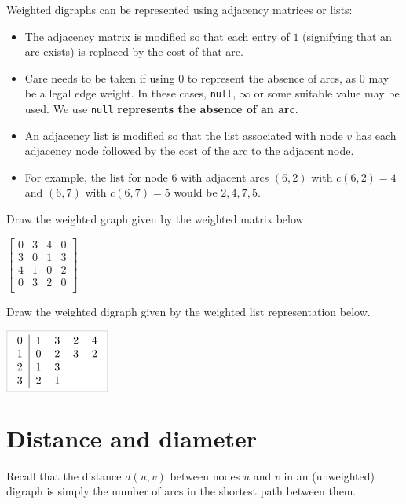 Weighted digraphs can be represented using adjacency matrices or lists:
\begin{itemize}
  \item The adjacency matrix is modified so that each entry of $1$ (signifying that an arc exists) 
  is replaced by the cost of that arc.
  \item Care needs to be taken if using 0 to represent the absence of arcs, as 0 may be a legal edge weight. 
  In these cases, \texttt{null}, $\infty$ or some suitable value may be used.
  We use  \texttt{null} \textbf{represents the absence of an arc}. 
  \item An adjacency list is modified so that the list associated  with node $v$ has each adjacency node followed by the cost of the arc to the adjacent node. 
  \item For example, the list for node 6 with adjacent arcs $(6,2)$ with $c(6,2) = 4$ and $(6,7)$ with $c(6,7) = 5$ would be $2,4,7,5$.
\end{itemize}

\begin{Boxample}[0] \label{ex:drawWeightedGraph}
Draw the weighted graph given by the weighted matrix below. 
\newline

$\left[
\begin{array}{cccc}
	0 & 3 & 4 & 0  \\
	3 & 0 & 1 & 3  \\
	4 & 1 & 0 & 2  \\
	0 & 3 & 2 & 0  \\
\end{array}
\right]$
\vspace{1cm}


Draw the weighted digraph given by the weighted list representation below.
\newline

$\AdjLists{
\begin{tabular}{c|llll}
	0 & 1 & 3 & 2 & 4 \\
	1 & 0 & 2 & 3 & 2 \\
	2 & 1 & 3 &   &   \\
	3 & 2 & 1 &   &   \\
\end{tabular}
}$
\end{Boxample}


\section{Distance and diameter} \label{sec:unweighted}
Recall that the distance $d(u,v)$ between nodes $u$ and $v$ in an (unweighted) digraph 
is simply the number of arcs in the shortest path between them. 

